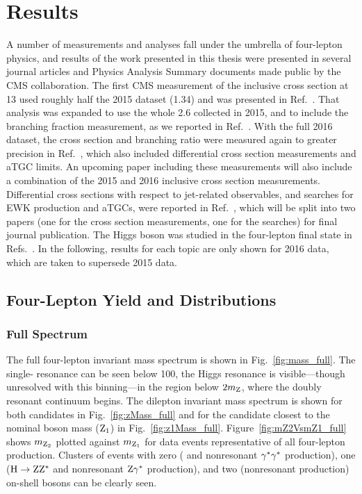
\chapter{Results}

A number of measurements and analyses fall under the umbrella of four-lepton physics, and results of the work presented in this thesis were presented in several journal articles and Physics Analysis Summary documents made public by the CMS collaboration.
The first CMS measurement of the {\ZZ} inclusive cross section at {13\TeV} used roughly half the 2015 dataset ({1.34\fbinv}) and was presented in Ref.~\cite{CMS:2015fnj}.
That analysis was expanded to use the whole {2.6\fbinv} collected in 2015, and to include the {\Zfourl} branching fraction measurement, as we reported in Ref.~\cite{Khachatryan:2016txa}.
With the full 2016 dataset, the {\ZZ} cross section and {\Zfourl} branching ratio were measured again to greater precision in Ref.~\cite{CMS:2017ruh}, which also included differential cross section measurements and aTGC limits.
An upcoming paper including these measurements will also include a combination of the 2015 and 2016 inclusive cross section measurements.
Differential cross sections with respect to jet-related observables, and searches for EWK {\ZZ} production and aTGCs, were reported in Ref.~\cite{CMS:2017dyw}, which will be split into two papers (one for the cross section measurements, one for the searches) for final journal publication.
The Higgs boson was studied in the four-lepton final state in Refs.~\cite{CMS:2016rqf,CMS:2016ilx,Sirunyan:2017exp}.
In the following, results for each topic are only shown for 2016 data, which are taken to supersede 2015 data.



\section{Four-Lepton Yield and Distributions}


\subsection{Full Spectrum}

The full four-lepton invariant mass spectrum is shown in Fig.~\ref{fig:mass_full}.
The single-{\PZ} resonance can be seen below {100\GeV}, the Higgs resonance is visible---though unresolved with this binning---in the {\Zgs} region below $2m_\mathrm{Z}$, where the doubly resonant {\ZZ} continuum begins.
The dilepton invariant mass spectrum is shown for both {\Zgs} candidates in Fig.~\ref{fig:zMass_full} and for the {\Zgs} candidate closest to the nominal {\PZ} boson mass ($\mathrm{Z}_1$) in Fig.~\ref{fig:z1Mass_full}.
Figure~\ref{fig:mZ2VsmZ1_full} shows $m_{\mathrm{Z}_2}$ plotted against $m_{\mathrm{Z}_1}$ for data events representative of all four-lepton production.
Clusters of events with zero ({\Zfourl} and nonresonant $\mathrm{\gamma}^\ast \mathrm{\gamma}^\ast$ production), one ($\mathrm{H} \to \mathrm{Z}\mathrm{Z}^\ast$ and nonresonant $\mathrm{Z}\mathrm{\gamma}^\ast$ production), and two (nonresonant {\ZZ} production) on-shell {\PZ} bosons can be clearly seen.

